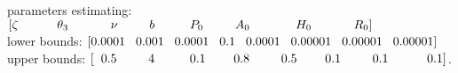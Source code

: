 \documentclass[12pt]{article}
\begin{document}
parameters estimating: $[ \zeta \hspace{1.1cm}   \theta_3 \hspace{1.2cm} \nu \hspace{0.9cm}   b \hspace{1cm}   P_0 \hspace{0.9cm} A_0 \hspace{1.3cm} H_0  \hspace{1.2cm}  R_0 ]$ \\
lower bounds:  \hspace{1.2cm} $[    0.0001   \hspace{0.3cm}     0.001 \hspace{0.3cm} 0.0001 \hspace{0.3cm}  0.1 \hspace{0.3cm}    0.0001 \hspace{0.3cm}      0.00001  \hspace{0.3cm}        0.00001 \hspace{0.3cm}     0.00001  ]$ \\
upper bounds:\hspace{1.3cm} $[\hspace{0.2cm} 0.5     \hspace{0.9cm}    4   \hspace{1cm} 0.1  \hspace{0.8cm}     0.8  \hspace{0.9cm}        0.5 \hspace{0.8cm}        0.1  \hspace{0.9cm}           0.1 \hspace{1.1cm}        0.1     ]$.
\end{document}
